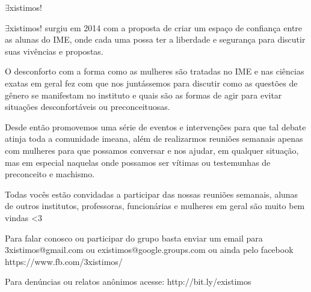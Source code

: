 \begin{subsecao}{$\exists$xistimos!}


$\exists$xistimos! surgiu em  2014 com a proposta de criar um espaço de
confiança entre as alunas do IME, onde cada uma possa ter a liberdade e
segurança para discutir suas vivências e propostas.

O desconforto com a forma como as mulheres são tratadas no IME e nas ciências
exatas em geral fez com que nos juntássemos para discutir como as questões de
gênero se manifestam no instituto e quais são as formas de agir para evitar
situações desconfortáveis ou preconceituosas.

Desde então promovemos uma série de eventos e intervenções para que tal debate
atinja toda a comunidade imeana, além de realizarmos reuniões semanais apenas
com mulheres para que possamos conversar e nos ajudar, em qualquer situação,
mas em especial naquelas onde possamos ser vítimas ou testemunhas de
preconceito e machismo.

Todas vocês estão convidadas a participar das nossas reuniões semanais, alunas
de outros institutos, professoras, funcionárias e mulheres em geral são muito
bem vindas <3

Para falar conosco ou participar do grupo basta enviar um email para
3xistimos@gmail.com ou existimos@google.groups.com ou ainda pelo facebook
https://www.fb.com/3xistimos/

Para denúncias ou relatos anônimos acesse: http://bit.ly/existimos
\end{subsecao}
